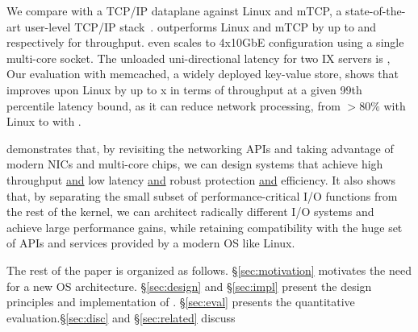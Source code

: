 We compare \ix with a TCP/IP dataplane against Linux
 and mTCP, a state-of-the-art user-level TCP/IP
stack~\cite{jeong2014mtcp}.  \ix outperforms Linux and mTCP by up to
 and  respectively for throughput. \ix
even scales to 4x10GbE configuration using a single multi-core socket.
The unloaded uni-directional latency for two IX servers is
\microsecond, 
Our evaluation with memcached, a widely deployed key-value store,
shows that \ix improves upon Linux by up to x in terms
of throughput at a given 99th percentile latency bound, as it can
reduce  network processing, from $>80\%$ with Linux to  with \ix.

\ix demonstrates that, by revisiting the networking APIs and taking
advantage of modern NICs and multi-core chips, we can design systems
that achieve high throughput \underline{and} low latency
\underline{and} robust protection \underline{and} efficiency. It also
shows that, by separating the small subset of performance-critical I/O
functions from the rest of the kernel, we can architect radically
different I/O systems and achieve large performance gains, while
retaining compatibility with the huge set of APIs and services
provided by a modern OS like Linux.

The rest of the paper is organized as follows. \S\ref{sec:motivation}
motivates the need for a new OS architecture. \S\ref{sec:design} and
\S\ref{sec:impl} present the design principles and implementation of
\ix. \S\ref{sec:eval} presents the quantitative
evaluation.\S\ref{sec:disc} and \S\ref{sec:related} discuss 







